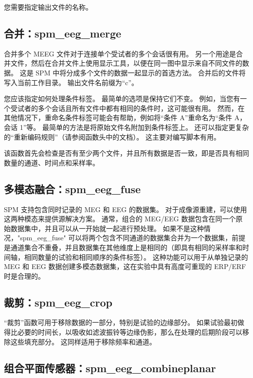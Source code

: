 您需要指定输出文件的名称。


\subsection{合并：spm\_eeg\_merge}

合并多个 MEEG 文件对于连接单个受试者的多个会话很有用。
另一个用途是合并文件，然后在合并文件上使用显示工具，以便在同一图中显示来自不同文件的数据。
这是 SPM 中将分成多个文件的数据一起显示的首选方法。
合并后的文件将写入当前工作目录。
输出文件名前缀为“c”。

您应该指定如何处理条件标签。
最简单的选项是保持它们不变。
例如，当您有一个受试者的多个会话且所有文件中都有相同的条件时，这可能很有用。
然而，在其他情况下，重命名条件标签可能会有帮助，例如将“条件 A”重命名为“条件 A，会话 1”等。
最简单的方法是将原始文件名附加到条件标签上。
还可以指定更复杂的“重新编码规则”（请参阅函数头中的文档）。
这主要对编写脚本有用。

该函数首先会检查是否有至少两个文件，并且所有数据是否一致，即是否具有相同数量的通道、时间点和采样率。


\subsection{多模态融合：spm\_eeg\_fuse}

SPM 支持包含同时记录的 MEG 和 EEG 的数据集。
对于成像源重建，可以使用这两种模态来提供源解决方案。
通常，组合的 MEG/EEG 数据包含在同一个原始数据集中，并且可以从一开始就一起进行预处理。
如果不是这种情况，"spm\_eeg\_fuse" 可以将两个包含不同通道的数据集合并为一个数据集，前提是通道集合不重叠，并且数据集在其他维度上是相同的（即具有相同的采样率和时间轴，相同数量的试验和相同顺序的条件标签）。
这种功能可以用于从单独记录的 MEG 和 EEG 数据创建多模态数据集，这在实验中具有高度可重现的 ERP/ERF 时是合理的。


\subsection{裁剪：spm\_eeg\_crop}

“裁剪”函数可用于移除数据的一部分，特别是试验的边缘部分。
如果试验最初做得比必要的时间长，以吸收如滤波振铃等边缘伪影，那么在处理的后期阶段可以移除这些填充部分。
这同样适用于移除频率和通道。


\subsection{组合平面传感器：spm\_eeg\_combineplanar}

